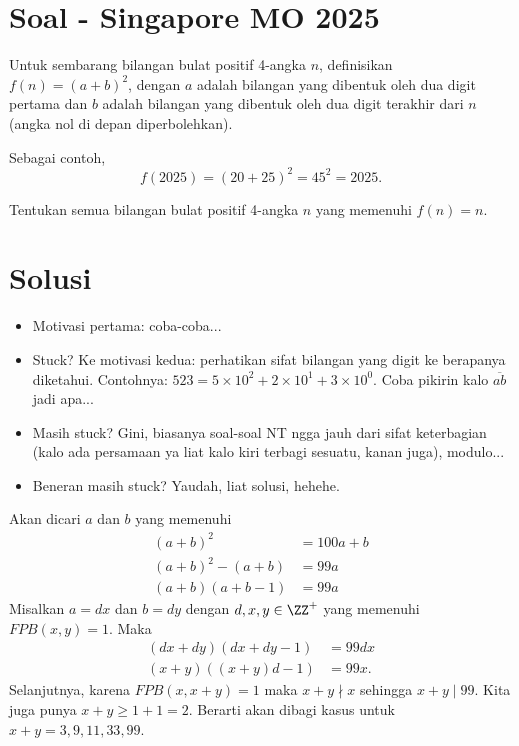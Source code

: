 \section{Soal - Singapore MO 2025}
Untuk sembarang bilangan bulat positif 4-angka $n$, definisikan $f(n)=(a+b)^2$, dengan $a$ adalah bilangan yang dibentuk oleh dua digit pertama dan $b$ adalah bilangan yang dibentuk oleh dua digit terakhir dari $n$ (angka nol di depan diperbolehkan).

Sebagai contoh,
$$f(2025) = (20+25)^2 = 45^2 = 2025.$$

Tentukan semua bilangan bulat positif 4-angka $n$ yang memenuhi $f(n)=n$.

\newpage
\section{Solusi}
\begin{remark*}
    \begin{itemize}
        \item Motivasi pertama: coba-coba...
        \item Stuck? Ke motivasi kedua: perhatikan sifat bilangan yang digit ke berapanya diketahui. Contohnya: $523 = 5 \times 10^2 + 2 \times 10^1 + 3 \times 10^0$. Coba pikirin kalo $\overline{ab}$ jadi apa...
        \item Masih stuck? Gini, biasanya soal-soal NT ngga jauh dari sifat keterbagian (kalo ada persamaan ya liat kalo kiri terbagi sesuatu, kanan juga), modulo...
        \item Beneran masih stuck? Yaudah, liat solusi, hehehe.
    \end{itemize}
\end{remark*}
Akan dicari $a$ dan $b$ yang memenuhi
\begin{align*}
    (a+b)^2&=100a+b\\
    (a+b)^2 - (a+b) &= 99a\\
    (a+b)(a+b-1) &= 99a
\end{align*}
Misalkan $a = dx$ dan $b = dy$ dengan $d,x,y \in \ZZ^+$  yang memenuhi $FPB(x,y) = 1$. Maka
\begin{align*}
    (dx+dy)(dx+dy-1) &= 99dx\\
    (x+y)((x+y)d-1) &= 99x.
\end{align*}
Selanjutnya, karena $FPB(x,x+y)=1$ maka $x+y \nmid x$ sehingga $x+y \mid 99$. Kita juga punya $x+y \ge 1+1 = 2$. Berarti akan dibagi kasus untuk $x+y=3,9,11,33,99$.
